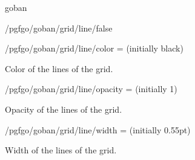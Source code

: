 \begin{environment}{{goban}}
\begin{stylekey}{/pgfgo/goban/grid/line/false}
		\begin{codeexample}[]
			\begin{goban}[9, grid = {line = false}, hoshi = {radius = 2pt}]
			\end{goban}
		\end{codeexample}
	\end{stylekey}

	\begin{key}{/pgfgo/goban/grid/line/color = (initially black)}

		Color of the lines of the grid.

		\begin{codeexample}[]

			\begin{goban}[grid = {line = {color = blue}}, name = a]
			\end{goban}

			\begin{goban}[grid = {line = {color = red}}, resume = a]
			\end{goban}
		\end{codeexample}
	\end{key}

	\begin{key}{/pgfgo/goban/grid/line/opacity = (initially 1)}

		Opacity of the lines of the grid.

		\begin{codeexample}[]

			\begin{goban}[name = a]
			\end{goban}

			\begin{goban}[grid = {line = {opacity = 0.2}}, resume = a]
			\end{goban}
		\end{codeexample}
	\end{key}

	\begin{key}{/pgfgo/goban/grid/line/width = (initially 0.55pt)}

		Width of the lines of the grid.

		\begin{codeexample}[]


\end{codeexample}
\end{key}
\end{environment}
